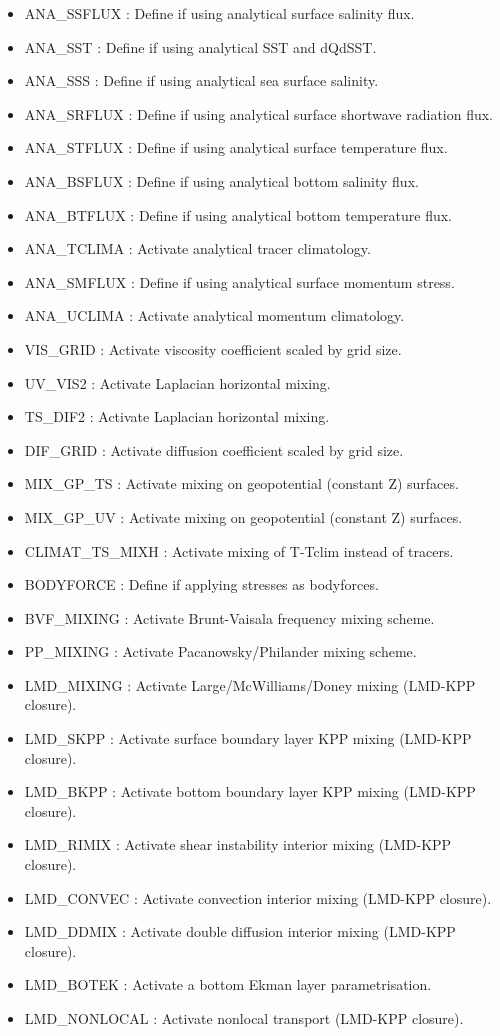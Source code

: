 \begin{itemize}
\item ANA\_SSFLUX : Define if using analytical surface salinity flux.
\item ANA\_SST : Define if using analytical SST and dQdSST.
\item ANA\_SSS : Define if using analytical sea surface salinity.
\item ANA\_SRFLUX : Define if using analytical surface shortwave radiation flux.
\item ANA\_STFLUX : Define if using analytical surface temperature flux.
\item ANA\_BSFLUX : Define if using analytical bottom salinity flux.
\item ANA\_BTFLUX : Define if using analytical bottom temperature flux.
\item ANA\_TCLIMA : Activate analytical tracer climatology.
\item ANA\_SMFLUX : Define if using analytical surface momentum stress.
\item ANA\_UCLIMA : Activate analytical momentum climatology.

\item VIS\_GRID : Activate viscosity coefficient scaled by grid size.
\item UV\_VIS2 : Activate Laplacian horizontal mixing.
\item TS\_DIF2 : Activate Laplacian horizontal mixing.
\item DIF\_GRID : Activate diffusion coefficient scaled by grid size.
\item MIX\_GP\_TS : Activate mixing on geopotential (constant Z) surfaces.
\item MIX\_GP\_UV : Activate mixing on geopotential (constant Z) surfaces.
\item CLIMAT\_TS\_MIXH : Activate mixing of T-Tclim instead of tracers.

\item BODYFORCE : Define if applying stresses as bodyforces.
\item BVF\_MIXING : Activate Brunt-Vaisala frequency mixing scheme.
\item PP\_MIXING : Activate Pacanowsky/Philander mixing scheme.
\item LMD\_MIXING : Activate Large/McWilliams/Doney mixing (LMD-KPP closure).
\item LMD\_SKPP : Activate surface boundary layer KPP mixing (LMD-KPP closure). 
\item LMD\_BKPP : Activate bottom boundary layer KPP mixing (LMD-KPP closure). 
\item LMD\_RIMIX : Activate shear instability interior mixing (LMD-KPP closure).
\item LMD\_CONVEC : Activate convection interior mixing (LMD-KPP closure).
\item LMD\_DDMIX : Activate double diffusion interior mixing (LMD-KPP closure). 
\item LMD\_BOTEK :  Activate a bottom Ekman layer parametrisation. 
\item LMD\_NONLOCAL : Activate nonlocal transport (LMD-KPP closure). 


\end{itemize}
